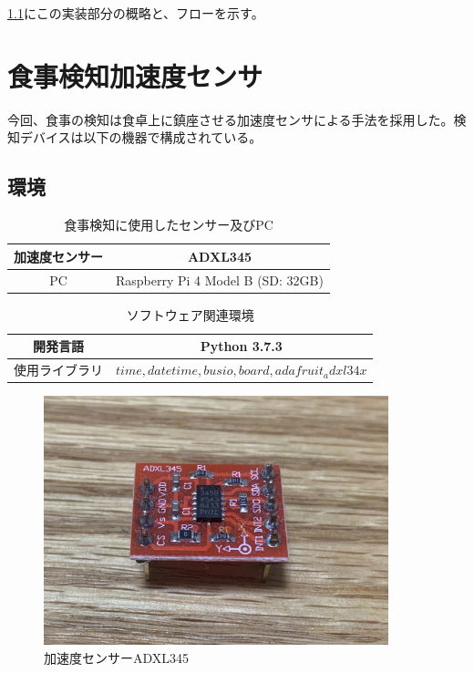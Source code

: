 \ref{}にこの実装部分の概略と、フローを示す。

\section{食事検知加速度センサ}

今回、食事の検知は食卓上に鎮座させる加速度センサによる手法を採用した。検知デバイスは以下の機器で構成されている。

\subsection{環境}

\begin{table}[htbp]
  \caption{食事検知に使用したセンサー及びPC}
  \label{tb:meal_detection_spec}
  \begin{center}
    \begin{tabular}{|c||c|}
      \hline
      加速度センサー & ADXL345 \\\hline
      PC & Raspberry Pi 4 Model B (SD: 32GB) \\\hline
    \end{tabular}
  \end{center}
\end{table}

\begin{table}[htbp]
  \caption{ソフトウェア関連環境}
  \label{tb:meal_detection_spec_sw}
  \begin{center}
    \begin{tabular}{|c||c|}
      \hline
      開発言語 & Python 3.7.3 \\\hline
      使用ライブラリ &  $ time, datetime, busio, board, adafruit_adxl34x $ \\\hline
    \end{tabular}
  \end{center}
\end{table}

\begin{figure}[htbp]
  \caption{加速度センサーADXL345}
  \label{fig:adxl345}
  \begin{center}
    \includegraphics[bb=0 0 1300 1000,width=10cm]{assets/adxl345.jpg}
  \end{center}
\end{figure}


